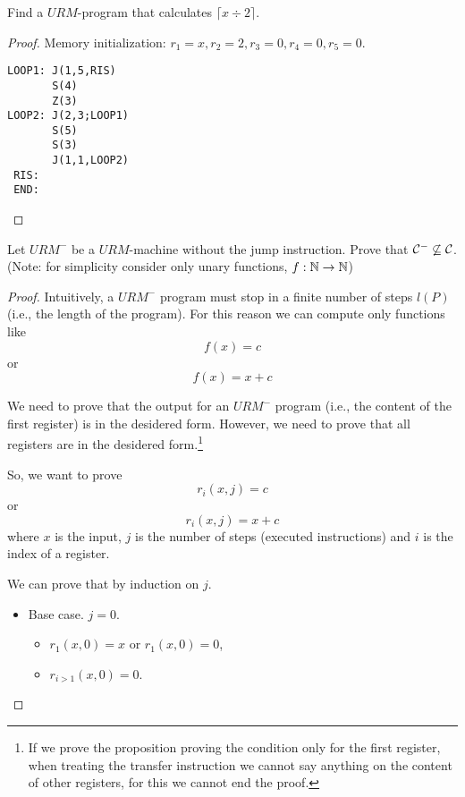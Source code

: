 \documentclass[12pt,a4paper,oneside]{book}
\begin{document}
\begin{exercise}
    Find a $URM$-program that calculates $\lceil x \div 2 \rceil$.

    \begin{proof}
        Memory initialization: $r_1 = x, r_2 = 2, r_3 = 0, r_4 = 0, r_5 = 0$.

\begin{verbatim}
LOOP1: J(1,5,RIS)
       S(4)
       Z(3)
LOOP2: J(2,3;LOOP1)
       S(5)
       S(3)
       J(1,1,LOOP2)
 RIS:
 END:
\end{verbatim}
    \end{proof}
\end{exercise}

\begin{exercise}
    Let $URM^-$ be a $URM$-machine without the jump instruction.
    Prove that $\mathcal{C}^- \not\subseteq \mathcal{C}$. (Note: for simplicity
    consider only unary functions, $f: \mathbb{N} \to \mathbb{N}$)

    \begin{proof}
        Intuitively, a $URM^-$ program must stop in a finite number of
        steps $l(P)$ (i.e., the length of the program).  For this
        reason we can compute only functions like
        \[ f(x) = c \]
        or
        \[ f(x) = x + c \]

        We need to prove that the output for an $URM^-$ program (i.e.,
        the content of the first register) is in the desidered form.
        However, we need to prove that all registers are in the
        desidered form.\footnote{If we prove the proposition proving
          the condition only for the first register, when treating the
          transfer instruction we cannot say anything on the content
          of other registers, for this we cannot end the proof.}

        So, we want to prove
        \[ r_i(x, j) = c \]
        or
        \[ r_i(x, j) = x + c \]
        where $x$ is the input, $j$ is the number of steps (executed
        instructions) and $i$ is the index of a register.

        We can prove that by induction on $j$.
        \begin{itemize}
            \item Base case. $j = 0$.
            \begin{itemize}
                \item $r_1(x, 0) = x$ or $r_1(x, 0) = 0$,
                \item $r_{i > 1} (x, 0) = 0$.
            \end{itemize}


\end{itemize}
\end{proof}
\end{exercise}
\end{document}
